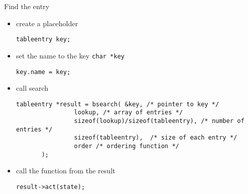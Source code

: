 \documentclass[xcolor=svgnames]{beamer}
\begin{document}
\begin{frame}[fragile]{Find the entry}
\begin{itemize}
\item create a placeholder
\begin{verbatim}
tableentry key;
\end{verbatim}
\item set the name to the key \texttt{char *key}
\begin{verbatim}
key.name = key;
\end{verbatim}
\item call search
\begin{verbatim}
tableentry *result = bsearch( &key, /* pointer to key */
                lookup, /* array of entries */
                sizeof(lookup)/sizeof(tableentry), /* number of entries */
                sizeof(tableentry),  /* size of each entry */
                order /* ordering function */
       );
\end{verbatim}
\item call the function from the result
\begin{verbatim}
result->act(state);
\end{verbatim}
\end{itemize}
\end{frame}
\end{document}
